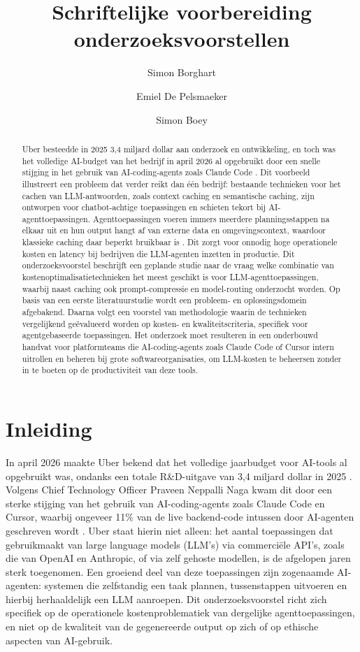 \documentclass{hogent-article}
\title{Schriftelijke voorbereiding onderzoeksvoorstellen}
\author{Simon Borghart}
\author{Emiel De Pelsmaeker}
\author{Simon Boey}
\begin{document}
\begin{abstract}
  Uber besteedde in 2025 3,4 miljard dollar aan onderzoek en ontwikkeling, en toch was het volledige AI-budget van het bedrijf in april 2026 al opgebruikt door een snelle stijging in het gebruik van AI-coding-agents zoals Claude Code \autocite{Jain2026}. Dit voorbeeld illustreert een probleem dat verder reikt dan één bedrijf: bestaande technieken voor het cachen van LLM-antwoorden, zoals context caching en semantische caching, zijn ontworpen voor chatbot-achtige toepassingen en schieten tekort bij AI-agenttoepassingen. Agenttoepassingen voeren immers meerdere planningsstappen na elkaar uit en hun output hangt af van externe data en omgevingscontext, waardoor klassieke caching daar beperkt bruikbaar is \autocite{Zhang2025}. Dit zorgt voor onnodig hoge operationele kosten en latency bij bedrijven die LLM-agenten inzetten in productie. Dit onderzoeksvoorstel beschrijft een geplande studie naar de vraag welke combinatie van kostenoptimalisatietechnieken het meest geschikt is voor LLM-agenttoepassingen, waarbij naast caching ook prompt-compressie en model-routing onderzocht worden. Op basis van een eerste literatuurstudie wordt een probleem- en oplossingsdomein afgebakend. Daarna volgt een voorstel van methodologie waarin de technieken vergelijkend geëvalueerd worden op kosten- en kwaliteitscriteria, specifiek voor agentgebaseerde toepassingen. Het onderzoek moet resulteren in een onderbouwd handvat voor platformteams die AI-coding-agents zoals Claude Code of Cursor intern uitrollen en beheren bij grote softwareorganisaties, om LLM-kosten te beheersen zonder in te boeten op de productiviteit van deze tools.
\end{abstract}

\tableofcontents

\section{Inleiding}%
\label{sec:inleiding}

In april 2026 maakte Uber bekend dat het volledige jaarbudget voor AI-tools al opgebruikt was, ondanks een totale R\&D-uitgave van 3,4 miljard dollar in 2025 \autocite{Jain2026}. Volgens Chief Technology Officer Praveen Neppalli Naga kwam dit door een sterke stijging van het gebruik van AI-coding-agents zoals Claude Code en Cursor, waarbij ongeveer 11\% van de live backend-code intussen door AI-agenten geschreven wordt \autocite{Jain2026}. Uber staat hierin niet alleen: het aantal toepassingen dat gebruikmaakt van large language models (LLM's) via commerciële API's, zoals die van OpenAI en Anthropic, of via zelf gehoste modellen, is de afgelopen jaren sterk toegenomen. Een groeiend deel van deze toepassingen zijn zogenaamde AI-agenten: systemen die zelfstandig een taak plannen, tussenstappen uitvoeren en hierbij herhaaldelijk een LLM aanroepen. Dit onderzoeksvoorstel richt zich specifiek op de operationele kostenproblematiek van dergelijke agenttoepassingen, en niet op de kwaliteit van de gegenereerde output op zich of op ethische aspecten van AI-gebruik.
\end{document}
